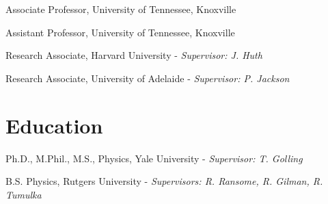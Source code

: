 \documentclass[11pt,letterpaper]{article}
\begin{document}
  \begin{itemizetight}


    \item Associate Professor, University of Tennessee, Knoxville 
    \item Assistant Professor, University of Tennessee, Knoxville 


    \item Research Associate, Harvard University - \emph{Supervisor: J. Huth} 


    \item Research Associate, University of Adelaide - \emph{Supervisor: P. Jackson} 


  \end{itemizetight}


\section*{Education}

  \begin{itemizetight}
    \item Ph.D., M.Phil., M.S., Physics, {Yale University} - \emph{Supervisor: T. Golling} 
    \item B.S. Physics, {Rutgers University} - \emph{Supervisors: R. Ransome, R. Gilman, R. Tumulka} 

  \end{itemizetight}
\end{document}
